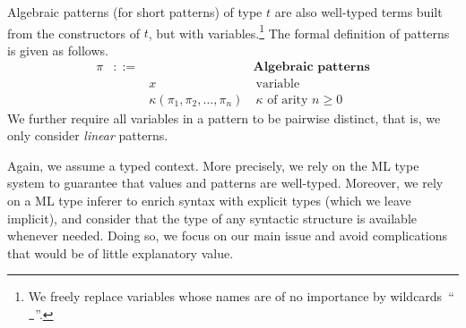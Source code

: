 \documentclass{LMCS}
\newcommand{\const}{\kappa}
\newcommand{\pt}{\pi}
\renewcommand{\_}{\mathord{\rule[-.25ex]{1ex}{.15ex}}}
\newcommand{\appnv}[4]{{#1}(#2, #3, \ldots{} , #4)}
\begin{document}
Algebraic patterns (for short patterns) of type $t$ are also well-typed
terms built from the constructors of $t$, but with
variables.\footnote{We freely replace variables
whose names are of no importance by wildcards~``$\_$''.} The formal
definition of patterns is given as follows.$$
\begin{array}{rcll}
  \pt &::=& &  \textbf{Algebraic patterns}\\
  && x & \ \textrm{variable} \\ 
  && \appnv{\const}{\pt_1}{\pt_2}{\pt_n} & \ \textrm{$\const$ of arity $n\geq 0$} 
\end{array}
$$
We further require all variables in
a pattern to be pairwise distinct, that is, we only consider
\emph{linear} patterns.


Again, we assume a typed context. More precisely, we rely on the ML type
system to guarantee that values and patterns are well-typed.
Moreover, we rely on a ML type inferer to enrich syntax with
explicit types (which we leave implicit), and consider that the
type of any syntactic structure is available whenever needed.
Doing so, we focus on our main issue and avoid complications that would
be of little explanatory value.
\end{document}
